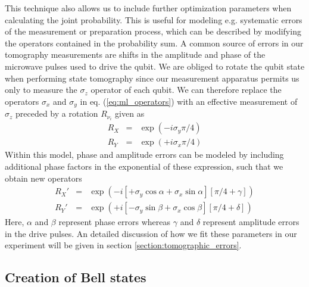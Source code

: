 This technique also allows us to include further optimization parameters when calculating the joint probability. This is useful for modeling e.g. systematic errors of the measurement or preparation process, which can be described by modifying the operators contained in the probability sum. A common source of errors in our tomography measurements are shifts in the amplitude and phase of the microwave pulses used to drive the qubit. We are obliged to rotate the qubit state when performing state tomography since our measurement apparatus permits us only to measure the $\sigma_z$ operator of each qubit. We can therefore replace the operators $\sigma_x$ and $\sigma_y$ in eq. (\ref{eq:ml_operators}) with an effective measurement of $\sigma_z$ preceded by a rotation $R_{\nu_i}$ given as
\begin{eqnarray}
R_{X} & = & \exp{\left( -i \sigma_y \pi / 4\right)} \\
R_{Y} & = & \exp{\left( +i \sigma_x \pi / 4\right)} 
\end{eqnarray}
Within this model, phase and amplitude errors can be modeled by including additional phase factors in the exponential of these expression, such that we obtain new operators
\begin{eqnarray}
R_{X}' & = & \exp{\left( -i \left[+\sigma_y\cos{\alpha}+\sigma_x\sin{\alpha} \right] \left[\pi / 4+\gamma\right]\right)} \\
R_{Y}' & = & \exp{\left( +i \left[-\sigma_y\sin{\beta}+\sigma_x\cos{\beta}\right] \left[\pi / 4+\delta\right]\right)} 
\end{eqnarray}
Here, $\alpha$ and $\beta$ represent phase errors whereas $\gamma$ and $\delta$ represent amplitude errors in the drive pulses. An detailed discussion of how we fit these parameters in our experiment will be given in section \ref{section:tomographic_errors}.

\subsection{Creation of Bell states}

